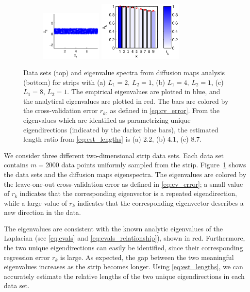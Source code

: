 \documentclass[3p]{elsarticle}
\begin{document}
\begin{figure}[!t]
\begin{subfigure}{0.25\textwidth}
\end{subfigure}
%
%
\begin{subfigure}{0.3\textwidth}
\includegraphics[height=2.5cm]{strip_data_L8}
\includegraphics[height=3cm]{strip_spectrum_L8}
\caption{}
\end{subfigure}
%
\caption{Data sets (top) and eigenvalue spectra from diffusion maps analysis (bottom) for strips with (a) $L_1 = 2$, $L_2 = 1$, (b) $L_1 = 4$, $L_2 = 1$, (c) $L_1 = 8$, $L_2 = 1$. The empirical eigenvalues are plotted in blue, and the analytical eigenvalues are plotted in red. The bars are colored by the cross-validation error $r_k$, as defined in \eqref{eq:cv_error}. From the eigenvalues which are identified as parametrizing unique eigendirections (indicated by the darker blue bars), the estimated length ratio from \eqref{eq:est_lengths} is (a) 2.2, (b) 4.1, (c) 8.7.
}
\label{fig:strip_compare_analytic}
\end{figure}

We consider three different two-dimensional strip data sets.
%
Each data set contains $m=2000$ data points uniformly sampled from the strip.
%
Figure~\ref{fig:strip_compare_analytic} shows the data sets and the diffusion maps eigenspectra.
%
The eigenvalues are colored by the leave-one-out cross-validation error as defined in \eqref{eq:cv_error};
a small value of $r_k$ indicates that the corresponding eigenvector is a repeated eigendirection, while a
large value of $r_k$ indicates that the corresponding eigenvector describes a new direction in the data.
%

The eigenvalues are consistent with the known analytic eigenvalues of
the Laplacian (see \eqref{eq:evals} and \eqref{eq:evals_relationship}), shown in red.
%
Furthermore, the two unique eigendirections can easily be identified, since their corresponding regression error $r_k$ is large.
%
As expected, the gap between the two meaningful eigenvalues increases as the strip becomes longer.
%
Using \eqref{eq:est_lengths}, we can accurately estimate the relative lengths of the two unique eigendirections in each data set.
\end{document}
